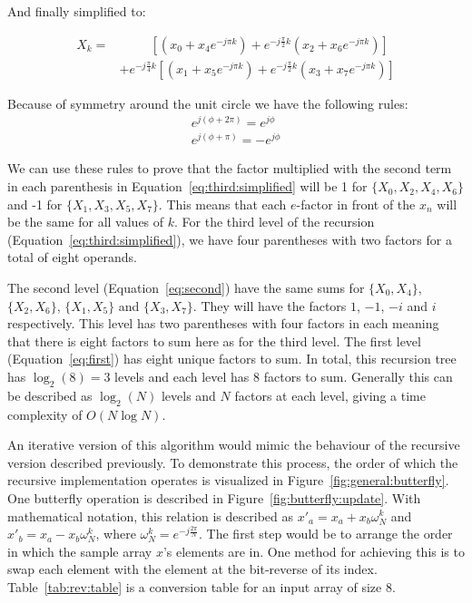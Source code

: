 And finally simplified to:

\begin{equation}
\begin{aligned}
    X_{k} =&\ \ \ \ \ \ \ \ \ \ \ \left[\left(x_0 + x_4e^{-j\pi k}\right) + e^{-j\frac{\pi}{2}k}\left(x_2 + x_6e^{-j\pi k}\right)\right]\\
           &+ e^{-j\frac{\pi}{4}k}\left[\left(x_1 + x_5e^{-j\pi k}\right) + e^{-j\frac{\pi}{2}k}\left(x_3 + x_7e^{-j\pi k}\right)\right]
\end{aligned}\label{eq:third:simplified}
\end{equation}

Because of symmetry around the unit circle we have the following rules:
\begin{gather*}
    e^{j(\phi + 2\pi)} = e^{j\phi}\\
    e^{j(\phi + \pi)} = -e^{j\phi}
\end{gather*}

We can use these rules to prove that the factor multiplied with the second term in each parenthesis in Equation~\ref{eq:third:simplified} will be 1 for $\{X_0, X_2, X_4, X_6\}$ and -1 for $\{X_1, X_3, X_5, X_7\}$. This means that each $e$-factor in front of the $x_n$ will be the same for all values of $k$. For the third level of the recursion (Equation~\ref{eq:third:simplified}), we have four parentheses with two factors for a total of eight operands.

The second level (Equation~\ref{eq:second}) have the same sums for $\{X_0, X_4\}$, $\{X_2, X_6\}$, $\{X_1, X_5\}$ and $\{X_3, X_7\}$.  They will have the factors $1$, $-1$, $-i$ and $i$ respectively. This level has two parentheses with four factors in each meaning that there is eight factors to sum here as for the third level. The first level (Equation~\ref{eq:first}) has eight unique factors to sum. In total, this recursion tree has $\log_2(8) = 3$ levels and each level has $8$ factors to sum. Generally this can be described as $\log_2(N)$ levels and $N$ factors at each level, giving a time complexity of $O(N\log{}N)$.


An iterative version of this algorithm would mimic the behaviour of the recursive version described previously. To demonstrate this process, the order of which the recursive implementation operates is visualized in Figure~\ref{fig:general:butterfly}. One butterfly operation is described in Figure~\ref{fig:butterfly:update}. With mathematical notation, this relation is described as $x'_a = x_a + x_b\omega^{k}_{N}$ and $x'_b = x_a - x_b\omega^{k}_{N}$, where $\omega^{k}_{N} = e^{-j\frac{2\pi}{N}}$. The first step would be to arrange the order in which the sample array $x$'s elements are in. One method for achieving this is to swap each element with the element at the bit-reverse of its index. Table~\ref{tab:rev:table} is a conversion table for an input array of size 8.

